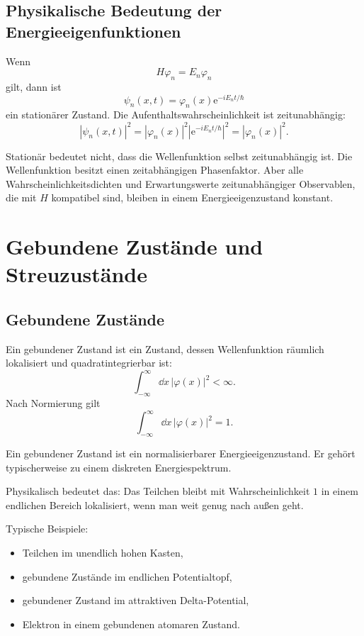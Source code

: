 \subsection{Physikalische Bedeutung der Energieeigenfunktionen}

Wenn
\[
    H\varphi_n=E_n\varphi_n
\]
gilt, dann ist
\[
    \psi_n(x,t)=\varphi_n(x)\mathrm{e}^{-iE_nt/\hbar}
\]
ein stationärer Zustand. Die Aufenthaltswahrscheinlichkeit ist zeitunabhängig:
\[
    |\psi_n(x,t)|^2
    =|\varphi_n(x)|^2\left|\mathrm{e}^{-iE_nt/\hbar}\right|^2
    =|\varphi_n(x)|^2.
\]

\begin{notebox}
Stationär bedeutet nicht, dass die Wellenfunktion selbst zeitunabhängig ist. Die Wellenfunktion besitzt einen zeitabhängigen Phasenfaktor. Aber alle Wahrscheinlichkeitsdichten und Erwartungswerte zeitunabhängiger Observablen, die mit $H$ kompatibel sind, bleiben in einem Energieeigenzustand konstant.
\end{notebox}

\section{Gebundene Zustände und Streuzustände}

\subsection{Gebundene Zustände}

Ein gebundener Zustand ist ein Zustand, dessen Wellenfunktion räumlich lokalisiert und quadratintegrierbar ist:
\[
    \int_{-\infty}^{\infty}\dd x\,|\varphi(x)|^2<\infty.
\]
Nach Normierung gilt
\[
    \int_{-\infty}^{\infty}\dd x\,|\varphi(x)|^2=1.
\]

\begin{definitionbox}
Ein gebundener Zustand ist ein normalisierbarer Energieeigenzustand. Er gehört typischerweise zu einem diskreten Energiespektrum.
\end{definitionbox}

Physikalisch bedeutet das: Das Teilchen bleibt mit Wahrscheinlichkeit $1$ in einem endlichen Bereich lokalisiert, wenn man weit genug nach außen geht.

Typische Beispiele:
\begin{itemize}
    \item Teilchen im unendlich hohen Kasten,
    \item gebundene Zustände im endlichen Potentialtopf,
    \item gebundener Zustand im attraktiven Delta-Potential,
    \item Elektron in einem gebundenen atomaren Zustand.
\end{itemize}

